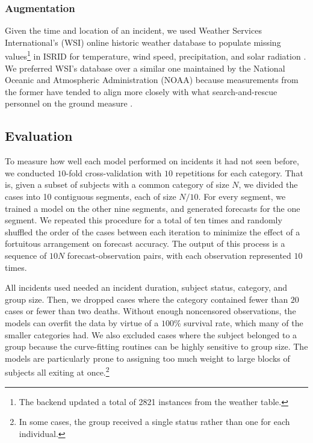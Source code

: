 \documentclass[12pt,titlepage]{article}
\begin{document}
      \subsubsection{Augmentation}
        Given the time and location of an incident, we used Weather Services
        International's (WSI) online historic weather database \cite{wsi} to
        populate missing values\footnote{The backend updated a total of 2821
        instances from the weather table.} in ISRID for temperature, wind
        speed, precipitation, and solar radiation . We preferred WSI's database
        over a similar one maintained by the National Oceanic and Atmospheric
        Administration (NOAA) because measurements from the former have tended
        to align more closely with what search-and-rescue personnel on the
        ground measure \cite{lee}.

    \subsection{Evaluation}
      To measure how well each model performed on incidents it had not seen
      before, we conducted $10$-fold cross-validation with $10$ repetitions for
      each category. That is, given a subset of subjects with a common
      category of size $N$, we divided the cases into 10 contiguous segments,
      each of size $N/10$. For every segment, we trained a model on the other
      nine segments, and generated forecasts for the one segment. We repeated
      this procedure for a total of ten times and randomly shuffled the order
      of the cases between each iteration to minimize the effect of a
      fortuitous arrangement on forecast accuracy. The output of this process
      is a sequence of $10N$ forecast-observation pairs, with each observation
      represented $10$ times.

      All incidents used needed an incident duration, subject status, category,
      and group size. Then, we dropped cases where the category contained fewer
      than $20$ cases or fewer than two deaths. Without enough noncensored
      observations, the models can overfit the data by virtue of a $100\%$
      survival rate, which many of the smaller categories had. We also
      excluded cases where the subject belonged to a group because the
      curve-fitting routines can be highly sensitive to group size. The models
      are particularly prone to assigning too much weight to large blocks of
      subjects all exiting at once.\footnote{In some cases, the group received
      a single status rather than one for each individual.}
\end{document}
